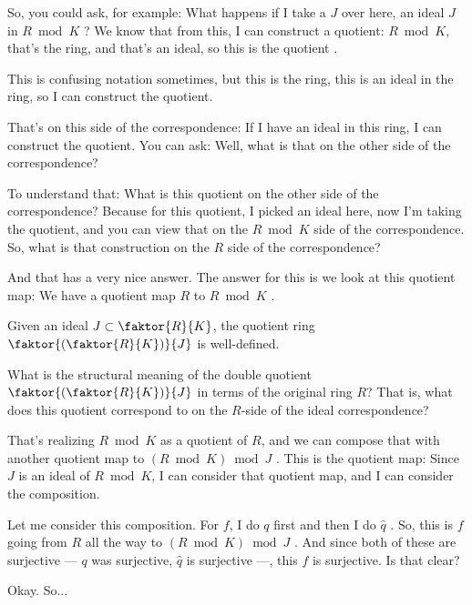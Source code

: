 \begin{speech}[00:02:37 - 00:03:48]
So, you could ask, for example: What happens if I take a $J$ over here, an ideal $J$ in $R \bmod K$ ? We know that from this, I can construct a quotient: $R \bmod K$, that's the ring, and that's an ideal, so this is the quotient .

This is confusing notation sometimes, but this is the ring, this is an ideal in the ring, so I can construct the quotient.

That's on this side of the correspondence: If I have an ideal in this ring, I can construct the quotient. You can ask: Well, what is that on the other side of the correspondence?

To understand that: What is this quotient on the other side of the correspondence?  Because for this quotient, I picked an ideal here, now I'm taking the quotient, and you can view that on the $R \bmod K$ side of the correspondence. So, what is that construction on the $R$ side of the correspondence?

And that has a very nice answer. The answer for this is we look at this quotient map: We have a quotient map $R$ to $R \bmod K$ .
\end{speech}

\begin{content}
Given an ideal $J \subset \faktor{R}{K}$, the quotient ring $\faktor{(\faktor{R}{K})}{J}$ is well-defined.
\begin{question}
What is the structural meaning of the double quotient $\faktor{(\faktor{R}{K})}{J}$ in terms of the original ring $R$? That is, what does this quotient correspond to on the $R$-side of the ideal correspondence?
\end{question}
\end{content}

\begin{speech}[00:03:48 - 00:05:06]
That's realizing $R \bmod K$ as a quotient of $R$, and we can compose that with another quotient map to $(R \bmod K) \bmod J$ . This is the quotient map: Since $J$ is an ideal of $R \bmod K$, I can consider that quotient map, and I can consider the composition.

Let me consider this composition. For $f$, I do $q$ first and then I do $\hat{q}$ . So, this is $f$ going from $R$ all the way to $(R \bmod K) \bmod J$ . And since both of these are surjective --- $q$ was surjective, $\hat{q}$ is surjective ---, this $f$ is surjective. Is that clear? 

Okay. So...
\end{speech}

